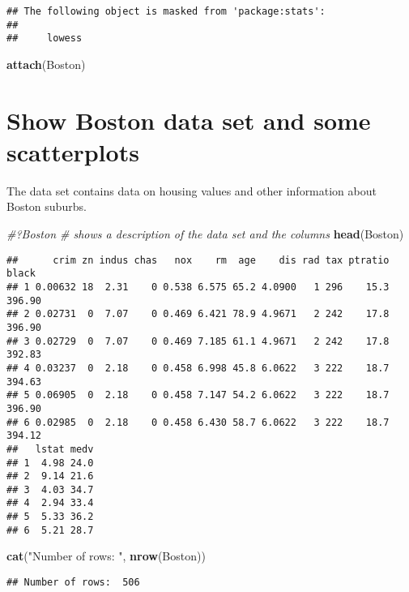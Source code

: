 \documentclass[]{article}
\newenvironment{Shaded}{\begin{snugshade}}{\end{snugshade}}
\newcommand{\CommentTok}[1]{\textcolor[rgb]{0.56,0.35,0.01}{\textit{#1}}}
\newcommand{\KeywordTok}[1]{\textcolor[rgb]{0.13,0.29,0.53}{\textbf{#1}}}
\newcommand{\NormalTok}[1]{#1}
\newcommand{\StringTok}[1]{\textcolor[rgb]{0.31,0.60,0.02}{#1}}
\begin{document}
\begin{verbatim}
## The following object is masked from 'package:stats':
## 
##     lowess
\end{verbatim}

\begin{Shaded}
\begin{Highlighting}[]
\KeywordTok{attach}\NormalTok{(Boston)}
\end{Highlighting}
\end{Shaded}

\hypertarget{show-boston-data-set-and-some-scatterplots}{%
\section{Show Boston data set and some
scatterplots}\label{show-boston-data-set-and-some-scatterplots}}

The data set contains data on housing values and other information about
Boston suburbs.

\begin{Shaded}
\begin{Highlighting}[]
\CommentTok{#?Boston # shows a description of the data set and the columns}
\KeywordTok{head}\NormalTok{(Boston)}
\end{Highlighting}
\end{Shaded}

\begin{verbatim}
##      crim zn indus chas   nox    rm  age    dis rad tax ptratio  black
## 1 0.00632 18  2.31    0 0.538 6.575 65.2 4.0900   1 296    15.3 396.90
## 2 0.02731  0  7.07    0 0.469 6.421 78.9 4.9671   2 242    17.8 396.90
## 3 0.02729  0  7.07    0 0.469 7.185 61.1 4.9671   2 242    17.8 392.83
## 4 0.03237  0  2.18    0 0.458 6.998 45.8 6.0622   3 222    18.7 394.63
## 5 0.06905  0  2.18    0 0.458 7.147 54.2 6.0622   3 222    18.7 396.90
## 6 0.02985  0  2.18    0 0.458 6.430 58.7 6.0622   3 222    18.7 394.12
##   lstat medv
## 1  4.98 24.0
## 2  9.14 21.6
## 3  4.03 34.7
## 4  2.94 33.4
## 5  5.33 36.2
## 6  5.21 28.7
\end{verbatim}

\begin{Shaded}
\begin{Highlighting}[]
\KeywordTok{cat}\NormalTok{(}\StringTok{"Number of rows: "}\NormalTok{, }\KeywordTok{nrow}\NormalTok{(Boston))}
\end{Highlighting}
\end{Shaded}

\begin{verbatim}
## Number of rows:  506
\end{verbatim}
\end{document}
